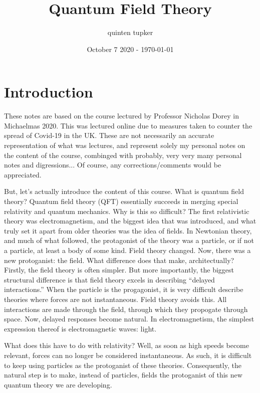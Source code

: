 \documentclass{article}
\title{Quantum Field Theory}
\author{quinten tupker}
\date{October 7 2020 - \today}
\theoremstyle{definition}
\begin{document}
\maketitle

\section*{Introduction}

These notes are based on the course lectured by Professor Nicholas Dorey in Michaelmas 2020.
This was lectured online due to measures taken to counter the spread of Covid-19
in the UK. These are not necessarily an accurate representation of what was
lectures, and represent solely my personal notes on the content of the course,
combinged with probably, very very many personal notes and digressions... Of
course, any corrections/comments would be appreciated.

But, let's actually introduce the content of this course. What is quantum field
theory? Quantum field theory (QFT) essentially succeeds in merging special
relativity
and quantum mechanics. Why is this so difficult? The first relativistic theory
was electromagnetism, and the biggest idea that was introduced, and what truly
set it apart from older theories was the idea of fields. In Newtonian theory, and much of what
followed, the protagonist of the theory was a particle, or if not a particle, at
least a body of some kind. Field theory changed. Now, there was a new
protoganist: the field. What difference does that make, architectually? Firstly,
the field theory is often simpler. But more importantly, the biggest structural
difference is that field theory excels in describing ``delayed interactions.''
When the particle is the progagonist, it is very difficult describe theories
where forces are not instantaneous. Field theory avoids this. All interactions
are made through the field, through which they propogate through space. Now,
delayed responses become natural. In electromagnetism, the simplest expression
thereof is electromagnetic waves: light. 

What does this have to do with relativity? Well, as soon as high speeds become
relevant, forces can no longer be considered instantaneous. As such, it is
difficult to keep using particles as the protoganist of these theories.
Consequently, the natural step is to make, instead of particles, fields the
protoganist of this new quantum theory we are developing.
\end{document}
